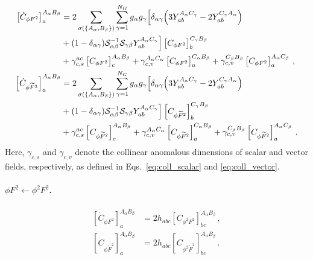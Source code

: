 \begin{align}
    \left[\dot C_{\phi F^2}\right]_a^{A_\alpha B_\beta} &= 
    2\sum_{\sigma(\{A_\alpha ,B_\beta\})}\sum_{\gamma=1}^{N_G}g_\alpha g_\gamma\Big[ \delta_{\alpha\gamma}\Big(3Y_{ab}^{A_\alpha C_\gamma}-2Y_{ab}^{C_\gamma A_\alpha}\Big) \nonumber\\
    & +(1-\delta_{\alpha\gamma}) \mathcal S_{\alpha\beta}^{-1} \mathcal{S}_{\gamma\beta}  Y_{ab }^{A_\alpha C_\gamma}   \Big]\left[C_{\phi F^2}\right]_{b}^{C_\gamma B_\beta}\label{eq:phiF2-phiF2} \\
    &+\gamma_{c,s}^{ac}\left[ C_{\phi  F^2}\right]_{c}^{A_\alpha B_\beta}+\gamma^{A_\alpha C_\alpha}_{c,v}\left[ C_{\phi  F^2}\right]_{a}^{C_\alpha B_\beta} + \gamma^{C_\beta B_\beta}_{c,v}\left[ C_{\phi F^2}\right]_{a}^{A_\alpha C_\beta}\,,\nonumber
\\
    \left[\dot{ C}_{\phi \widetilde F^2}\right]_a^{A_\alpha B_\beta} &= 
    2\sum_{\sigma(\{A_\alpha ,B_\beta\})}\sum_{\gamma=1}^{N_G}g_\alpha g_\gamma\Big[ \delta_{\alpha\gamma}\Big(3Y_{ab}^{A_\alpha C_\gamma}-2Y_{ab}^{C_\gamma A_\alpha}\Big)\nonumber\\
    & +(1-\delta_{\alpha\gamma}) \mathcal S_{\alpha\beta}^{-1} \mathcal{S}_{\gamma\beta}  Y_{ab }^{A_\alpha C_\gamma}   \Big]\left[ C_{\phi \widetilde F^2}\right]_{b}^{C_\gamma B_\beta}\label{eq:phiFt2-phiFt2}\\
    &+\gamma_{c,s}^{ac}\left[ C_{\phi  \widetilde{F}^2}\right]_{c}^{A_\alpha B_\beta}+\gamma^{A_\alpha C_\alpha}_{c,v}\left[ C_{\phi  \widetilde{F}^2}\right]_{a}^{C_\alpha B_\beta} + \gamma^{C_\beta B_\beta}_{c,v}\left[ C_{\phi \widetilde{F}^2}\right]_{a}^{A_\alpha C_\beta}\,.\nonumber
\end{align}
Here, $\gamma_{c,s}$ and $\gamma_{c,v}$ denote the collinear anomalous dimensions of scalar and vector fields, respectively, as defined in Eqs.~\eqref{eq:coll_scalar} and \eqref{eq:coll_vector}.

\paragraph{\texorpdfstring{$\phi F^2 \leftarrow \phi^2 F^2$}{phiF2fromphi2F2}.}
\label{par:phiF2<-phi2F2}

\begin{align}
    \left[\dot C_{\phi F^2}\right]_a^{A_\alpha B_\beta} &=
    2 h_{abc}\left[C_{\phi^2 F^2}\right]_{bc}^{A_\alpha B_\beta}\,,
\\
    \left[\dot C_{\phi \widetilde F^2}\right]_a^{A_\alpha B_\beta} &=
    2 h_{abc}\left[C_{\phi^2 \widetilde F^2}\right]_{bc}^{A_\alpha B_\beta}\,.
\end{align}

